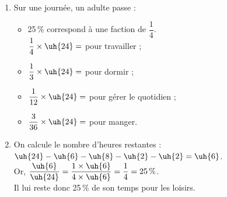 \begin{colonne*exercice}
\begin{corrige}
   \ \\ [-5mm]
   \begin{enumerate}
      \item Sur une journée, un adulte passe : \smallskip
      \begin{itemize}
         \item 25\,\% correspond à une faction de $\dfrac14$. \\ [2mm]
            \quad $\dfrac14\times\uh{24} =$ {\blue {} pour travailler} ; \\ [2mm]
         \item $\dfrac13\times\uh{24} =$ {\blue {} pour dormir} ; \\ [2mm]
         \item $\dfrac1{12}\times\uh{24} =$ {\blue {} pour gérer le quotidien} ; \\ [2mm]
         \item $\dfrac{3}{36}\times\uh{24} =$ {\blue {} pour manger.} \\ [3mm]
      \end{itemize}
      \item On calcule le nombre d'heures restantes : \\
          $\uh{24}-\uh{6}-\uh{8}-\uh{2}-\uh{2} =\uh{6}$. \\ [2mm]
         Or, $\dfrac{\uh{6}}{\uh{24}} =\dfrac{1\times\uh{6}}{4\times\uh{6}} =\dfrac14 =25\,\%$. \\ [2mm]
         {\blue Il lui reste donc 25\,\% de son temps pour les loisirs}. \bigskip
   \end{enumerate} 
\end{corrige}

\bigskip



\end{colonne*exercice}
